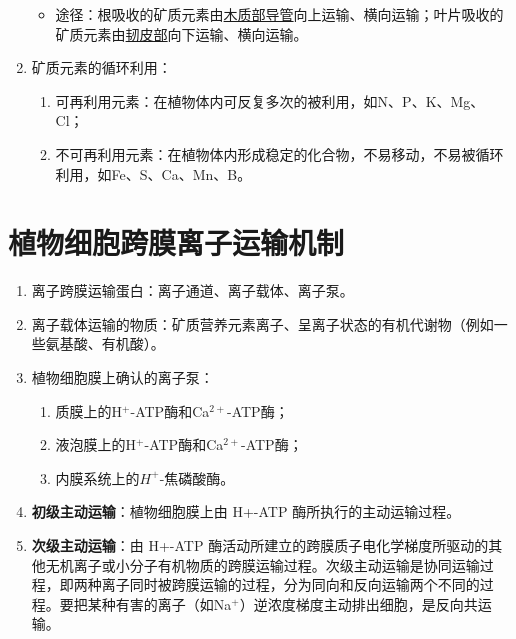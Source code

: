 \begin{enumerate}
\begin{itemize}
        \item 途径：根吸收的矿质元素由\uline{木质部导管}向上运输、横向运输；叶片吸收的矿质元素由\uline{韧皮部}向下运输、横向运输。
    \end{itemize}
    \item 矿质元素的循环利用：
    \begin{enumerate}
        \item 可再利用元素：在植物体内可反复多次的被利用，如N、P、K、Mg、Cl；
        \item 不可再利用元素：在植物体内形成稳定的化合物，不易移动，不易被循环利用，如Fe、S、Ca、Mn、B。
    \end{enumerate}
\end{enumerate}

\section{植物细胞跨膜离子运输机制}
\begin{enumerate}
    \item 离子跨膜运输蛋白：离子通道、离子载体、离子泵。
    \item 离子载体运输的物质：矿质营养元素离子、呈离子状态的有机代谢物（例如一些氨基酸、有机酸）。
    \item 植物细胞膜上确认的离子泵：
    \begin{enumerate}
        \item 质膜上的H$^+$-ATP酶和Ca$^{2+}$-ATP酶；
        \item 液泡膜上的H$^+$-ATP酶和Ca$^{2+}$-ATP酶；
        \item 内膜系统上的$H^+$-焦磷酸酶。
    \end{enumerate}
    \item \textbf{初级主动运输}：植物细胞膜上由 H+-ATP 酶所执行的主动运输过程。
    \item \textbf{次级主动运输}：由 H+-ATP 酶活动所建立的跨膜质子电化学梯度所驱动的其他无机离子或小分子有机物质的跨膜运输过程。次级主动运输是协同运输过程，即两种离子同时被跨膜运输的过程，分为同向和反向运输两个不同的过程。要把某种有害的离子（如Na$^+$）逆浓度梯度主动排出细胞，是反向共运输。
\end{enumerate}